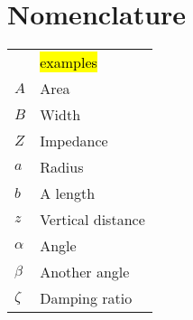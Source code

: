 \chapter{Nomenclature}

\begin{longtable}{ll}
           & \hl{examples}     \\
  $A$      & Area              \\
  $B$      & Width             \\
  $Z$      & Impedance         \\
  $a$      & Radius            \\
  $b$      & A length          \\
  $z$      & Vertical distance \\
  $\alpha$ & Angle             \\
  $\beta$  & Another angle     \\
  $\zeta$  & Damping ratio
\end{longtable}